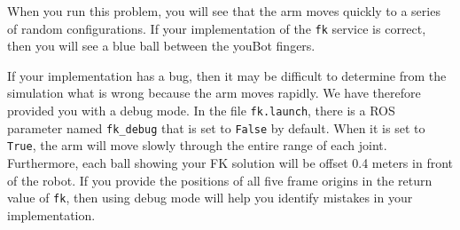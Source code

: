 When you run this problem, you will see that the arm moves quickly to a series of random
configurations. If your implementation of the \texttt{fk} service is correct, then you will see a
blue ball between the youBot fingers.

If your implementation has a bug, then it may be difficult to determine from the simulation what is
wrong because the arm moves rapidly. We have therefore provided you with a debug mode. In the file
\texttt{fk.launch}, there is a ROS parameter named \texttt{fk\_debug} that is set to
\texttt{False} by default. When it is set to \texttt{True}, the arm will move slowly through the
entire range of each joint. Furthermore, each ball showing your FK solution will be offset 0.4
meters in front of the robot. If you provide the positions of all five frame origins in the return
value of \texttt{fk}, then using debug mode will help you identify mistakes in your implementation.

